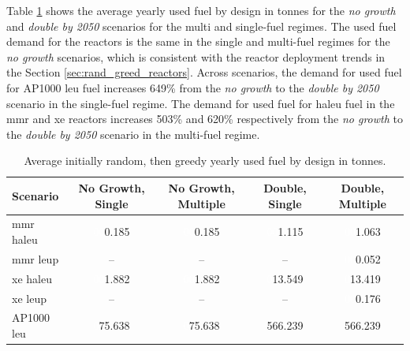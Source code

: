 Table \ref{tab:rand_greed_used_avg} shows the average yearly used fuel by design in tonnes for the \textit{no growth} and \textit{double by 2050} scenarios for the multi and single-fuel regimes. The used fuel demand for the reactors is the same in the single and multi-fuel regimes for the \textit{no growth} scenarios, which is consistent with the reactor deployment trends in the Section \ref{sec:rand_greed_reactors}. Across scenarios, the demand for used fuel for AP1000 \gls{leu} fuel increases 649\% from the \textit{no growth} to the \textit{double by 2050} scenario in the single-fuel regime. The demand for used fuel for \gls{haleu} fuel in the \gls{mmr} and \gls{xe} reactors increases 503\% and 620\% respectively from the \textit{no growth} to the \textit{double by 2050} scenario in the multi-fuel regime.

  \begin{table}[H]
    \centering
    \caption{Average initially random, then greedy yearly used fuel by design in tonnes.}
    \label{tab:rand_greed_used_avg}
    \begin{tabular}{l c c c c}
       \hline
       Scenario & No Growth, Single & No Growth, Multiple & Double, Single & Double, Multiple  \\
       \hline
       \gls{mmr} \gls{haleu}   & \textcolor{white}{00}0.185    & \textcolor{white}{00}0.185   & \textcolor{white}{00}1.115    & \textcolor{white}{00}1.063    \\
       \gls{mmr} \gls{leup}    & --       & --      & --       & \textcolor{white}{00}0.052    \\
       \gls{xe} \gls{haleu}    & \textcolor{white}{00}1.882    & \textcolor{white}{00}1.882   & \textcolor{white}{0}13.549   & \textcolor{white}{0}13.419   \\
       \gls{xe} \gls{leup}     & --       & --      & --       & \textcolor{white}{00}0.176    \\
       AP1000 \gls{leu}        & \textcolor{white}{0}75.638   & \textcolor{white}{0}75.638  & 566.239  & 566.239  \\
       \hline
    \end{tabular}
  \end{table}
